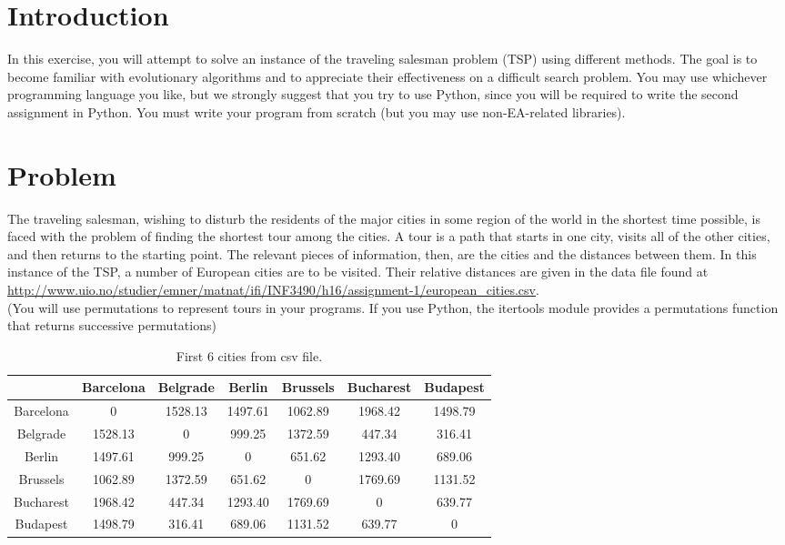 \documentclass{article}           %
\begin{document}
\section*{Introduction}
In this exercise, you will attempt to solve an instance of the traveling
salesman problem (TSP) using different methods. The goal is to become familiar
with evolutionary algorithms and to appreciate their effectiveness on a
difficult search problem. You may use
whichever programming language you like, but we strongly suggest that you try
to use Python, since you will be required to write the second assignment in
Python. You must write your program from scratch (but you may use
non-EA-related libraries).

\section*{Problem}

The traveling salesman, wishing to disturb the residents of the major cities
in some region of the world in the shortest time possible, is faced with the
problem of finding the shortest tour among the cities. A tour is a path that
starts in one city, visits all of the other cities, and then returns to the
starting point. The relevant pieces of information, then, are the cities and
the distances between them. In this instance of the TSP, a number of European
cities are to be visited. Their relative distances are given in the data file
found at
\url{http://www.uio.no/studier/emner/matnat/ifi/INF3490/h16/assignment-1/european_cities.csv}.\\
(You will use permutations to represent tours in your programs. If you use
Python, the itertools module provides a permutations function that returns
successive permutations)

\begin{table}[]
\centering
  \begin{tabular}{|c|c|c|c|c|c|c|}
    \hline
              & Barcelona & Belgrade & Berlin  & Brussels & Bucharest & Budapest \\ \hline
    Barcelona & 0         & 1528.13  & 1497.61 & 1062.89  & 1968.42   & 1498.79  \\ \hline
    Belgrade  & 1528.13   & 0        & 999.25  & 1372.59  & 447.34    & 316.41   \\ \hline
    Berlin    & 1497.61   & 999.25   & 0       & 651.62   & 1293.40   & 689.06   \\ \hline
    Brussels  & 1062.89   & 1372.59  & 651.62  & 0        & 1769.69   & 1131.52  \\ \hline
    Bucharest & 1968.42   & 447.34   & 1293.40 & 1769.69  & 0         & 639.77   \\ \hline
    Budapest  & 1498.79   & 316.41   & 689.06  & 1131.52  & 639.77    & 0        \\ \hline
  \end{tabular}
  \caption{First 6 cities from csv file.}
  \label{tab:cities}
\end{table}
\end{document}
